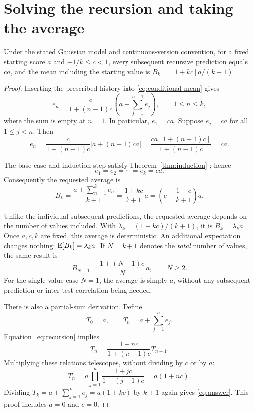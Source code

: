 \chapter{Solving the recursion and taking the average}

\begin{theorem}
\label{thm:single-start}
Under the stated Gaussian model and continuous-version convention, for a
fixed starting score \(a\) and \(-1/k\leq c<1\), every subsequent recursive
prediction equals \(ca\), and the mean including the starting value is
\(B_k=[1+kc]a/(k+1)\).
\end{theorem}
\begin{proof}

Inserting the prescribed history into \eqref{eq:conditional-mean} gives
\begin{equation}
  e_n=\frac{c}{1+(n-1)c}
         \left(a+\sum_{j=1}^{n-1}e_j\right),
  \qquad 1\leq n\leq k,
  \label{eq:recursion}
\end{equation}
where the sum is empty at \(n=1\). In particular, \(e_1=ca\).
Suppose \(e_j=ca\) for all \(1\leq j<n\). Then
\[
  e_n=\frac{c}{1+(n-1)c}\bigl[a+(n-1)ca\bigr]
      =\frac{ca[1+(n-1)c]}{1+(n-1)c}=ca.
\]
\begin{samepage}
The base case and induction step satisfy Theorem~\ref{thm:induction}
\citep[Section 10.1]{hammack2018}; hence
\begin{equation}
  \boxed{e_1=e_2=\cdots=e_k=ca.}\label{eq:all-predictions}
\end{equation}
Consequently the requested average is
\begin{equation}
  \boxed{B_k=\frac{a+\sum_{n=1}^{k}e_n}{k+1}
    =\frac{1+kc}{k+1}\,a
    =\left(c+\frac{1-c}{k+1}\right)a.}
  \label{eq:answer}
\end{equation}
\end{samepage}
Unlike the individual subsequent predictions, the requested average depends
on the number of values included. With
\(\lambda_k=(1+kc)/(k+1)\), it is \(B_k=\lambda_k a\).
Once \(a,c,k\) are fixed, this average is deterministic. An additional
expectation changes nothing: \(\operatorname{E}[B_k]=\lambda_k a\).
If \(N=k+1\) denotes the \emph{total} number of values, the same result is
\begin{equation}
  \boxed{B_{N-1}=\frac{1+(N-1)c}{N}\,a,\qquad N\geq2.}
  \label{eq:total-count}
\end{equation}
For the single-value case \(N=1\), the average is simply \(a\), without
any subsequent prediction or inter-test correlation being needed.

There is also a partial-sum derivation. Define
\[
  T_0=a,\qquad T_n=a+\sum_{j=1}^{n}e_j.
\]
Equation~\eqref{eq:recursion} implies
\[
  T_n=\frac{1+nc}{1+(n-1)c}T_{n-1}.
\]
Multiplying these relations telescopes, without dividing by \(c\) or by
\(a\):
\[
  T_n=a\prod_{j=1}^{n}\frac{1+jc}{1+(j-1)c}=a(1+nc).
\]
Dividing \(T_k=a+\sum_{j=1}^{k}e_j=a(1+kc)\) by \(k+1\) again gives
\eqref{eq:answer}. This proof includes \(a=0\) and \(c=0\).
\end{proof}

